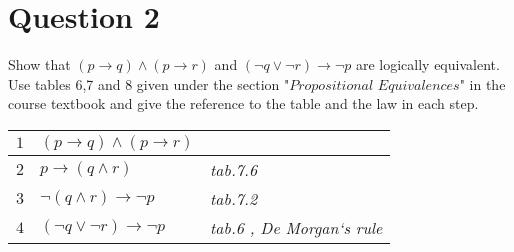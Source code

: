 \documentclass[a4paper,12pt]{article}
\newcommand\tab[1][1cm]{\hspace*{#1}}
\begin{document}
\section*{Question 2 \hfill {}}
\tab Show that $(p \rightarrow q) \wedge (p \rightarrow r)$ and $(\neg q \vee \neg r)\rightarrow \neg p$ are logically equivalent. Use tables 6,7 and 8 given under the section "$\textit{Propositional Equivalences}$" in the course textbook and give the reference to the table and the law in each step.

\begin{tcolorbox}
\begin{table}[H]
    \centering
    \begin{tabular}{*3{l}}
    $1$ & $(p \rightarrow q) \wedge (p \rightarrow r)$ &  \\
    \hline \hline
    $2$ & $p \rightarrow (q \wedge r) $ & \textit{tab.7.6} \\
    \hline
    $3$ & $\neg(q \wedge r) \rightarrow \neg p$ & \textit{tab.7.2} \\
    \hline
    $4$ & $(\neg q \vee \neg r)\rightarrow \neg p$ & \textit{tab.6 , De Morgan`s rule} \\
    \end{tabular}
\end{table}
\end{tcolorbox}
\newpage
\end{document}
